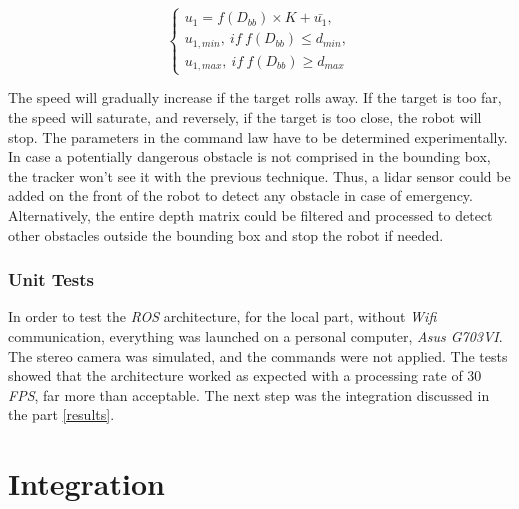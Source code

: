 		
		\begin{equation}\label{eq:math}
		\begin{cases}
		u_1 = f(D_{bb})\times K + \bar{u_1},\\
		u_{1,min},\ if\ f(D_{bb}) \leq d_{min},\\
		u_{1,max},\ if\ f(D_{bb}) \geq d_{max}		
		\end{cases}
		\end{equation}
				
		The speed will gradually increase if the target rolls away.
		If the target is too far, the speed will saturate, and reversely, 
		if the target is too close, the robot will stop. 
		The parameters in the command law have to be determined
		experimentally.
		\\\indent In case a potentially dangerous obstacle is not comprised in the 
		bounding box, the tracker won't see it with the previous technique. Thus, a lidar sensor
		could be added on the front of the robot to detect any obstacle in case of emergency.
		Alternatively, the entire depth matrix could be filtered and processed to detect
		other obstacles outside the bounding box and stop the robot if needed.
		
		\subsection{Unit Tests}\label{hardwaretests}
		
		In order to test the \textit{ROS} architecture, 
		for the local part, without \textit{Wifi} communication,
		everything was launched on a personal computer, \textit{Asus G703VI}.
		The stereo camera was simulated, and the commands were not 
		applied. The tests showed that the architecture
		worked as expected with a processing rate of 30 \textit{FPS},
		far more than acceptable. The next step was the integration discussed
		in the part \vref{results}.
			
\chapter{Integration}\label{results}
	
